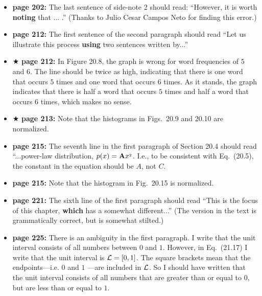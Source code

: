 \documentclass[12pt]{article}
\begin{document}
\begin{itemize}
  \item {\bf page 202:}  The last sentence of side-note 2 should read:
    ``However, it is worth {\bf noting} that ... .''  (Thanks to Julio
    Cesar Campos Neto for finding this error.)

  \item {\bf page 212:} The first sentence of the second paragraph
    should read ``Let us illustrate this process {\bf using} two
    sentences written by...'' %

  \item $\bigstar$ {\bf page 212:} In Figure 20.8, the graph is wrong
    for word frequencies of $5$ and $6$.  The line should be twice as
    high, indicating that there is one word that occurs $5$ times and
    one word that occurs $6$ times.  As it stands, the graph indicates
    that there is half a word that occurs $5$ times and half a word
    that occurs $6$ times, which makes no sense. 

  \item $\bigstar$ {\bf page 213:}  Note that the histograms in
    Figs.~20.9 and 20.10 are normalized.  


  \item {\bf page 215:}  The seventh line in the first paragraph of
    Section 20.4 should read ``...power-law distribution, $p(x) = {\bf
      A}x^{_2}$.  I.e., to be consistent with Eq.~(20.5), the constant
    in the equation should be $A$, not $C$. 

  \item {\bf page 215:}  Note that the histogram in Fig.~20.15 is
    normalized. 

  \item {\bf page 221:}  The sixth line of the first paragraph should
    read ``This is the focus of this chapter, {\bf which} has a
    somewhat different...''  (The version in the text is grammatically
    correct, but is somewhat stilted.) 

  \item {\bf page 225:}  There is an ambiguity in the first
    paragraph.  I write that the unit interval consists of all
    numbers between $0$ and $1$.  However, in Eq.~(21.17) I write that
    the unit interval is ${\cal L} = [0,1]$.  The square brackets mean
    that the endpoints---i.e. $0$ and $1$ ---are included in ${\cal
      L}$.  So I should have written that the unit interval consists
    of all numbers that are greater than or equal to $0$, but are less
    than or equal to $1$.  


\end{itemize}
\end{document}
